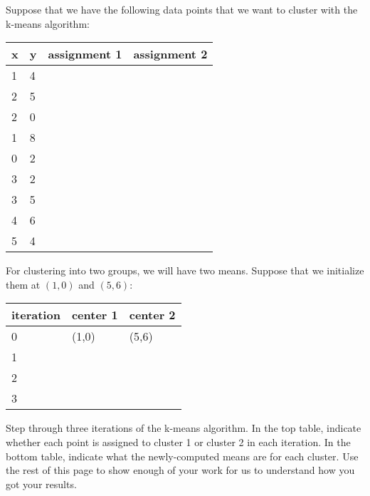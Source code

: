 \documentclass[11pt,letterpaper,boxed]{hmcpset}
\begin{document}
\begin{problem}
Suppose that we have the following data points that we want to cluster
with the k-means algorithm:
\begin{tabular}{|l|l|l|l|}
\hline
\textbf{x} & \textbf{y} & assignment 1 & assignment 2 \\
\hline
1 & 4 & &  \\
\hline  
 2 & 5 & & \\
\hline  
 2 & 0 & & \\
\hline  
 1 & 8 & &  \\
\hline  
 0 & 2 & & \\
\hline  
 3 & 2 & & \\
\hline  
 3 & 5 & & \\
\hline  
 4 & 6 & & \\
\hline  
 5 & 4 & & \\
\hline
\end{tabular}

For clustering into two groups, we will have two means. Suppose that
we initialize them at $(1,0)$ and $(5,6)$:

\begin{tabular}{|l|l|l|}
\hline 
\textbf{iteration} & center 1 & center 2 \\
\hline
0 & (1,0) & (5,6) \\
\hline  
 1 & & \\
\hline  
 2 & & \\
\hline  
 3 & & \\
\hline
\end{tabular}

Step through three iterations of the k-means algorithm. In the top
table, indicate whether each point is assigned to cluster 1 or cluster
2 in each iteration. In the bottom table, indicate what the
newly-computed means are for each cluster. Use the rest of this page
to show enough of your work for us to understand how you got your results.
\end{problem}
\begin{solution}
\vspace{10cm}
\end{solution}
\end{document}
